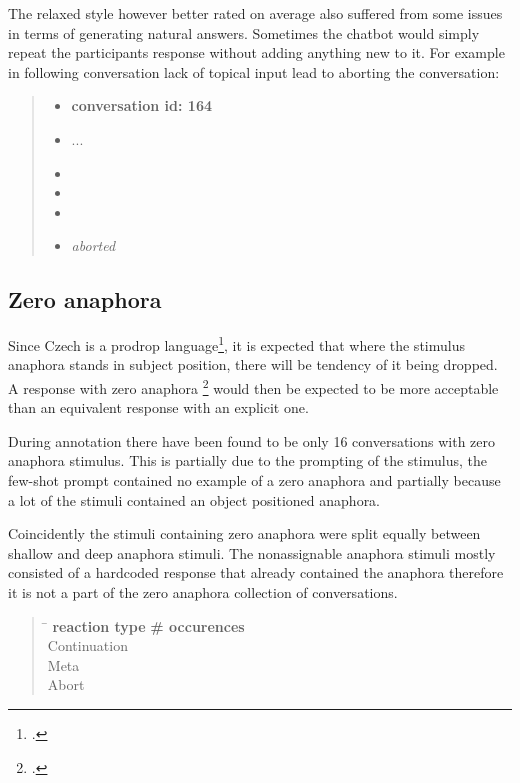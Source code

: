 The relaxed style however better rated on average also suffered from some issues
in terms of generating natural answers.
Sometimes the chatbot would simply repeat the participants response without adding anything new to it.
For example in following conversation lack of topical input lead to aborting the conversation:

\begin{quote}
\begin{itemize}[label={}, leftmargin=0pt, itemsep=0.5em]
\item \textbf{conversation id: 164}
\item ...
\item {}
\item {}
\item {}
\item \textit{aborted}
\end{itemize}
\end{quote}


\subsection{Zero anaphora}

Since Czech is a prodrop language\footcite{pevskova2019slavic},
it is expected that where the stimulus anaphora stands in subject position,
there will be tendency of it being dropped.
A response with zero anaphora \footcite{zero} would then be expected to be more acceptable
than an equivalent response with an explicit one.

During annotation there have been found to be only 16 conversations with zero anaphora stimulus.
This is partially due to the prompting of the stimulus,
the few-shot prompt contained no example of a zero anaphora and
partially because a lot of the stimuli contained an object positioned anaphora.

Coincidently the stimuli containing zero anaphora were split equally between shallow and deep anaphora stimuli.
The nonassignable anaphora stimuli mostly consisted of a hardcoded response that already contained the anaphora
therefore it is not a part of the zero anaphora collection of conversations.

\begin{quote}
\begin{tabbing}
\hspace{4cm} \= \hspace{3cm} \kill %
\textbf{reaction type} \> \textbf{\# occurences}\\
Continuation  \\
Meta  \\
Abort   \\
\end{tabbing}
\end{quote}

